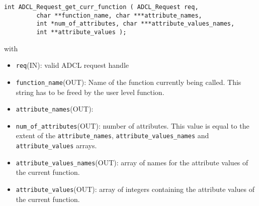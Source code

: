 \begin{verbatim}
int ADCL_Request_get_curr_function ( ADCL_Request req, 
         char **function_name, char ***attribute_names, 
         int *num_of_attributes, char ***attribute_values_names, 
         int **attribute_values );
\end{verbatim}
with
\begin{itemize}
\item {\tt req}(IN): valid ADCL request handle
\item {\tt function\_name}(OUT): Name of the function currently being
  called. This string has to be freed by the user level function.
\item {\tt attribute\_names}(OUT):
\item {\tt num\_of\_attributes}(OUT): number of attributes. This value is equal
  to the extent of the {\tt attribute\_names}, {\tt attribute\_values\_names}
  and {\tt attribute\_values} arrays.
\item {\tt attribute\_values\_names}(OUT): array of names for the attribute values
  of the current function.
\item {\tt attribute\_values}(OUT): array of integers containing the attribute
  values of the current function.
\end{itemize}
\hspace{1cm}


